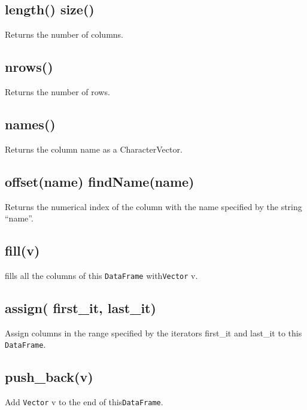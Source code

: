 \documentclass[]{book}
\begin{document}
\hypertarget{length-size-1}{%
\subsection{length() size()}\label{length-size-1}}

Returns the number of columns.

\hypertarget{nrows}{%
\subsection{nrows()}\label{nrows}}

Returns the number of rows.

\hypertarget{names-1}{%
\subsection{names()}\label{names-1}}

Returns the column name as a CharacterVector.

\hypertarget{offsetname-findnamename}{%
\subsection{offset(name) findName(name)}\label{offsetname-findnamename}}

Returns the numerical index of the column with the name specified by the string ``name''.

\hypertarget{fillv}{%
\subsection{fill(v)}\label{fillv}}

fills all the columns of this \texttt{DataFrame} with\texttt{Vector} v.

\hypertarget{assign-first_it-last_it-1}{%
\subsection{assign( first\_it, last\_it)}\label{assign-first_it-last_it-1}}

Assign columns in the range specified by the iterators first\_it and last\_it to this \texttt{DataFrame}.

\hypertarget{push_backv}{%
\subsection{push\_back(v)}\label{push_backv}}

Add \texttt{Vector} v to the end of this\texttt{DataFrame}.
\end{document}

